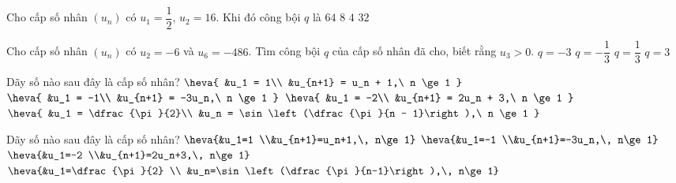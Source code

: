 \begin{ex}%
	Cho cấp số nhân  $(u_n)$ có $u_1=\dfrac{1}{2}$, $u_2=16$. Khi đó công bội $q$ là
	 \choice
		 {$64$}
		 {$8$}
		 {$4$}
		{\True  $32$}
\end{ex}

\begin{ex}%
	Cho cấp số nhân $(u_n)$ có $u_2=-6$ và $u_6=-486$. Tìm công bội  $q$ của cấp số nhân đã cho, biết rằng $u_3>0$.
	 \choice
		{$q=-3$} 
		 {$q=-\dfrac{1}{3}$}
		{$q=\dfrac{1}{3}$} 
		{\True  $q=3$}
\end{ex}

\begin{ex}%
	Dãy số nào sau  đây là cấp số nhân?
	\choice 
		{$ 
		\heva{ 
		 &u_1 = 1\\
		&u_{n+1} = u_n + 1,\ n  \ge 1
		 }
		$} 
		{\True $ 
		\heva{ 
		 &u_1 = -1\\
		&u_{n+1}  = -3u_n,\ n \ge 1
		 }
		 $}
		{$ 
		\heva{ 
		&u_1 =  -2\\
		&u_{n+1} = 2u_n + 3,\ n  \ge 1
		} 
		 $}
		{$ 
		\heva{ 
		&u_1 =  \dfrac{\pi}{2}\\
		&u_n = \sin\left(\dfrac{\pi}{n -  1}\right),\ n \ge 1
		} 
		$} 
\end{ex}

\begin{ex}%
	Dãy  số nào sau đây là cấp số nhân?
	 \choice
		 {$\heva{&u_1=1 \\&u_{n+1}=u_n+1,\, n\ge 1}$}
		{\True $\heva{&u_1=-1 \\&u_{n+1}=-3u_n,\,  n\ge 1}$}
		{$\heva{&u_1=-2 \\&u_{n+1}=2u_n+3,\, n\ge  1}$}
		{$\heva{&u_1=\dfrac{\pi}{2}  \\ &u_n=\sin \left(\dfrac{\pi}{n-1}\right),\, n\ge 1}$}
\end{ex}

